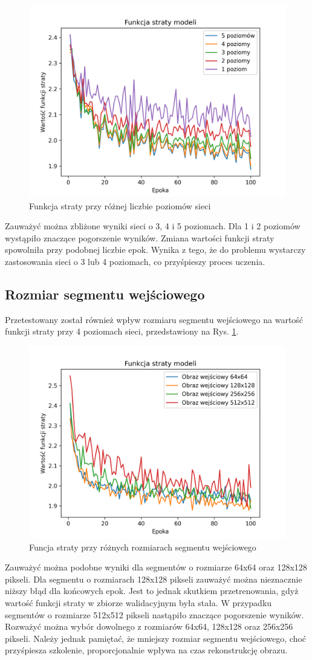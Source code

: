 \documentclass[a4paper, 12pt]{article}
\begin{document}
\thispagestyle{empty}
\newpage
\restoregeometry
\begin{figure}[h!]
\begin{center}
	\includegraphics[width=0.7\columnwidth]{layers.png}
	\caption{Funkcja straty przy różnej liczbie poziomów sieci}
\end{center}
\end{figure}
Zauważyć można zbliżone wyniki sieci o 3, 4 i 5 poziomach.
Dla 1 i 2 poziomów wystąpiło znaczące pogorszenie wyników. Zmiana wartości funkcji straty spowolniła przy podobnej liczbie epok.
Wynika z tego, że do problemu wystarczy zastosowania sieci o 3 lub 4 poziomach, co przyśpieszy proces uczenia.
\subsection{Rozmiar segmentu wejściowego}
Przetestowany został również wpływ rozmiaru segmentu wejściowego na wartość funkcji straty przy 4 poziomach sieci, przedstawiony na Rys. \ref{fig:size}.
\begin{figure}[h!]
\begin{center}
	\includegraphics[width=0.7\columnwidth]{size.png}
	\caption{Funcja straty przy różnych rozmiarach segmentu wejściowego}
	\label{fig:size}
\end{center}
\end{figure}
Zauważyć można podobne wyniki dla segmentów o rozmiarze 64x64 oraz 128x128 pikseli.
Dla segmentu o rozmiarach 128x128 pikseli zauważyć można nieznacznie niższy błąd dla końcowych epok.
Jest to jednak skutkiem przetrenowania, gdyż wartość funkcji straty w zbiorze walidacyjnym była stała.
W przypadku segmentów o rozmiarze 512x512 pikseli nastąpiło znaczące pogorszenie wyników.
Rozważyć można wybór dowolnego z rozmiarów 64x64, 128x128 oraz 256x256 pikseli.
Należy jednak pamiętać, że mniejszy rozmiar segmentu wejściowego, choć przyśpiesza szkolenie,
proporcjonalnie wpływa na czas rekonstrukcję obrazu.
\end{document}
